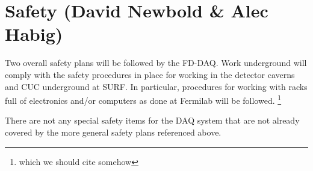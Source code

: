 

\section{Safety (David Newbold \& Alec Habig)}
\label{sec:fdsp-daq-safety}


Two overall safety plans will be followed by the FD-DAQ.  Work
underground will comply with the safety procedures in place for working
in the detector caverns and CUC underground at SURF.  In particular,
procedures for working with racks full of electronics and/or computers
as done at Fermilab will be followed.  \footnote{which we should cite somehow}

There are not any special safety items for the DAQ system that are not
already covered by the more general safety plans referenced above. 





